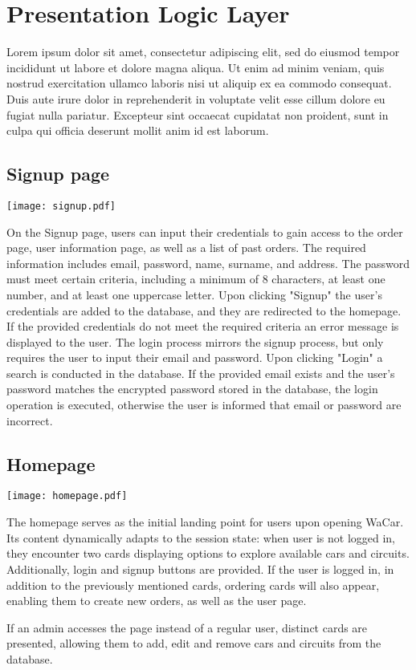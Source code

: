 \section{Presentation Logic Layer}


Lorem ipsum dolor sit amet, consectetur adipiscing elit, sed do eiusmod tempor incididunt ut labore et dolore magna aliqua. Ut enim ad minim veniam, quis nostrud exercitation ullamco laboris nisi ut aliquip ex ea commodo consequat. Duis aute irure dolor in reprehenderit in voluptate velit esse cillum dolore eu fugiat nulla pariatur. Excepteur sint occaecat cupidatat non proident, sunt in culpa qui officia deserunt mollit anim id est laborum.

\subsection{Signup page}


\texttt{[image: signup.pdf]}

On the Signup page, users can input their credentials to gain access to the order page, user information page, as well as a list of past orders.
The required information includes email, password, name, surname, and address. The password must meet certain criteria, including a minimum of 8 characters, at least one number, and at least one uppercase letter. 
Upon clicking "Signup" the user's credentials are added to the database, and they are redirected to the homepage.
If the provided credentials do not meet the required criteria an error message is displayed to the user.
The login process mirrors the signup process, but only requires the user to input their email and password. Upon clicking "Login" a search is conducted in the database. 
If the provided email exists and the user's password matches the encrypted password stored in the database, the login operation is executed, otherwise the user is informed that email or password are incorrect.

\subsection{Homepage}


\texttt{[image: homepage.pdf]}

The homepage serves as the initial landing point for users upon opening WaCar. Its content dynamically adapts to the session state: when user is not logged in, 
they encounter two cards displaying options to explore available cars and circuits. Additionally, login and signup buttons are provided.
If the user is logged in, in addition to the previously mentioned cards, ordering cards will also appear, enabling them to create new orders, as well as the user page.

If an admin accesses the page instead of a regular user, distinct cards are presented, allowing them to add, edit and remove cars and circuits from the database.